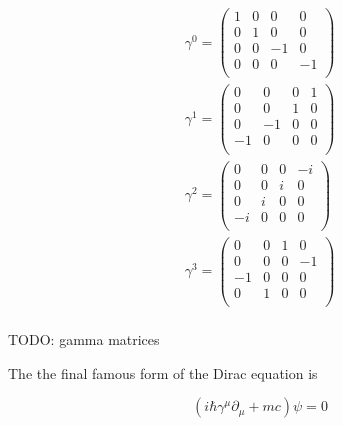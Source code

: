 \begin{equation*}
    \begin{gathered}
        \gamma^{0} = 
         \begin{pmatrix}
          1 & 0 & 0 & 0 \\
          0 & 1 & 0 & 0 \\
          0 & 0 & -1 & 0 \\
          0 & 0 & 0 & -1 \\
         \end{pmatrix} \\
        \gamma^{1} = 
         \begin{pmatrix}
          0 & 0 & 0 & 1 \\
          0 & 0 & 1 & 0 \\
          0 & -1 & 0 & 0 \\
          -1 & 0 & 0 & 0 \\
         \end{pmatrix} \\
        \gamma^{2} = 
         \begin{pmatrix}
          0 & 0 & 0 & -i \\
          0 & 0 & i & 0 \\
          0 & i & 0 & 0 \\
          -i & 0 & 0 & 0 \\
         \end{pmatrix} \\
        \gamma^{3} = 
         \begin{pmatrix}
          0 & 0 & 1 & 0 \\
          0 & 0 & 0 & -1 \\
          -1 & 0 & 0 & 0 \\
          0 & 1 & 0 & 0 \\
         \end{pmatrix} \\
    \end{gathered}
\end{equation*}

TODO: gamma matrices

The the final famous form of the Dirac equation is

\begin{equation}
    \label{eq:dirac_original}
    ( i \hbar \gamma^{\mu} \partial_{\mu} + mc) \psi = 0
\end{equation}
